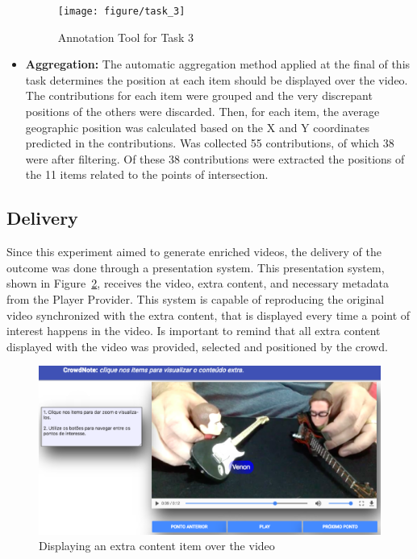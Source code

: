 \begin{itemize}
\begin{figure}[h!]
	\centerline{\texttt{[image: figure/task\_3]}}
	\caption{Annotation Tool for Task 3}
	\label{task_3}
\end{figure}

\item \textbf{Aggregation:} The automatic aggregation method applied at the final of this task determines the position at each item should be displayed over the video. The contributions for each item were grouped and the very discrepant positions of the others were discarded. Then, for each item, the average geographic position was calculated based on the X and Y coordinates predicted in the contributions. Was collected 55 contributions, of which 38 were after filtering. Of these 38 contributions were extracted the positions of the 11 items related to the points of intersection.

\end{itemize}


\subsection{Delivery}

Since this experiment aimed to generate enriched videos, the delivery of the outcome was done through a presentation system. This presentation system, shown in Figure~\ref{player}, receives the video, extra content, and necessary metadata from the Player Provider. This system is capable of reproducing the original video synchronized with the extra content, that is displayed every time a point of interest happens in the video. Is important to remind that all extra content displayed with the video was provided, selected and positioned by the crowd.



\begin{figure}[h!]
	\centerline{\includegraphics[scale=0.17] {figure/player}}
	\caption{Displaying an extra content item over the video}
	\label{player}
\end{figure}

